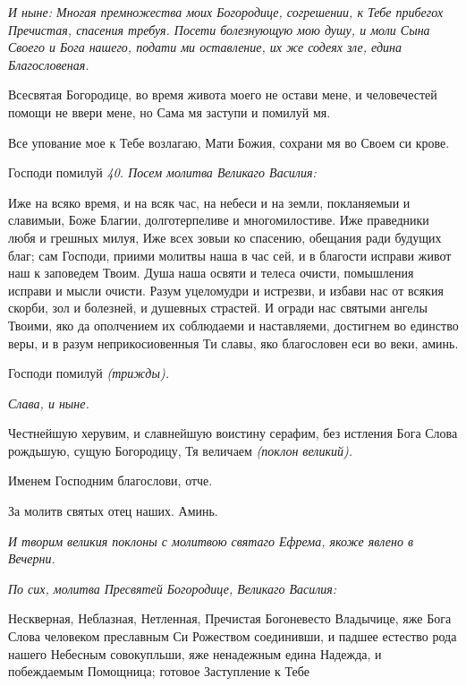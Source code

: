  \itshape И ныне:\normalfont{} Многая премножества моих Богородице, согрешении, к Тебе
прибегох Пречистая, спасения требуя. Посети болезнующую мою душу, и
моли Сына Своего и Бога нашего, подати ми оставление, их же содеях зле,
едина Благословеная.


   Всесвятая Богородице, во время живота моего не остави мене, и
человечестей помощи не ввери мене, но Сама мя заступи и помилуй
мя.


   Все упование мое к Тебе возлагаю, Мати Божия, сохрани мя во Своем си
крове.


   Господи помилуй \itshape 40. Посем молитва Великаго Василия:\normalfont{}


   Иже на всяко время, и на всяк час, на небеси и на земли, покланяемыи и
славимыи, Боже Благии, долготерпеливе и многомилостиве. Иже
праведники любя и грешных милуя, Иже всех зовыи ко спасению, обещания
ради будущих благ; сам Господи, приими молитвы наша в час сей,
и в благости исправи живот наш к заповедем Твоим. Душа наша
освяти и телеса очисти, помышления исправи и мысли очисти. Разум
уцеломудри и истрезви, и избави нас от всякия скорби, зол и болезней, и
душевных страстей. И огради нас святыми ангелы Твоими, яко да
ополчением их соблюдаеми и наставляеми, достигнем во единство веры, и в
разум неприкосиовенныя Ти славы, яко благословен еси во веки,
аминь.


   Господи помилуй \itshape (трижды)\normalfont{}.


 \itshape Слава, и ныне\normalfont{}.


   Честнейшую херувим, и славнейшую воистину серафим, без истления
Бога Слова рождьшую, сущую Богородицу, Тя величаем \itshape (поклон
великий)\normalfont{}.


   Именем Господним благослови, отче.


   За молитв святых отец наших. Аминь.


 \itshape И творим великия поклоны с молитвою святаго Ефрема, якоже явлено в
Вечерни.\normalfont{}


 \itshape По сих, молитва Пресвятей Богородице, Великаго Василия:\normalfont{}


   Нескверная, Неблазная, Нетленная, Пречистая Богоневесто Владычице,
яже Бога Слова человеком преславным Си Рожеством соединивши, и падшее
естество рода нашего Небесным совокупльши, яже ненадежным едина
Надежда, и побеждаемым Помощница; готовое Заступление к Тебе

